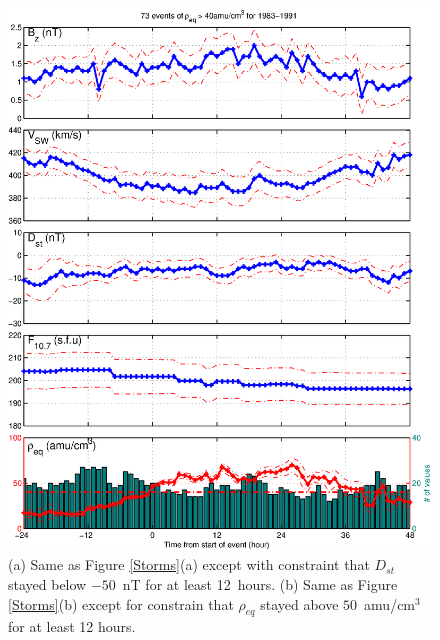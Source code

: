 \documentclass[10pt,twocolumn]{article}
\begin{document}
\begin{figure}[tp!]
\includegraphics[scale=0.40]{paperfigures/stormavs-md12.eps}
\caption{(a) Same as Figure \ref{Storms}(a) except with constraint that $D_{st}$ stayed below $-50$~nT for at least 12~hours. (b) Same as Figure \ref{Storms}(b) except for constrain that $\rho_{eq}$ stayed above $50$~amu/cm$^3$ for at least 12 hours.}
\label{Mspec}
\end{figure}
\clearpage
\end{document}
